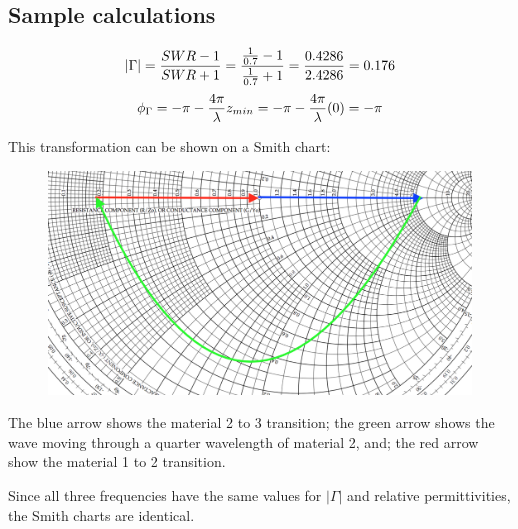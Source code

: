 \subsection*{Sample calculations}
\begin{align*}
	\left|\Gamma\right| = {SWR - 1 \over SWR + 1} = {\frac{1}{0.7} - 1 \over \frac{1}{0.7} + 1 } = {0.4286 \over 2.4286} = 0.176
\end{align*}
\begin{align*}
	\phi_\Gamma = - \pi - {4 \pi \over \lambda}z_{min} = - \pi - {4 \pi \over \lambda}(0) = -\pi
\end{align*}

This transformation can be shown on a Smith chart:

\begin{figure}[tbph]
\centering
\includegraphics[width=0.7\linewidth]{graphics/Task3-12-Smith}
\label{fig:Smith}
\end{figure}

The blue arrow shows the material 2 to 3 transition; the green arrow shows the wave moving through a quarter wavelength of material 2, and; the red arrow show the material 1 to 2 transition.

Since all three frequencies have the same values for $\left|\Gamma\right|$ and relative permittivities, the Smith charts are identical.
